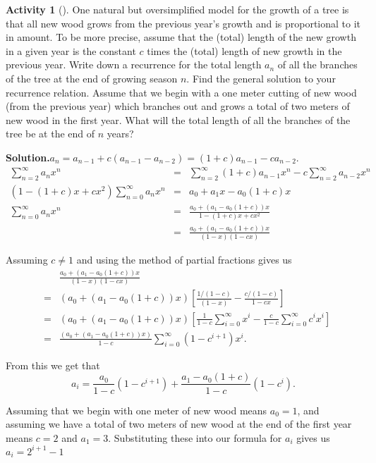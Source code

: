 \documentclass[10pt,]{book}
\theoremstyle{plain}
\theoremstyle{definition}
\newtheorem{activity}[project]{Activity}
\numberwithin{equation}{chapter}
\newcommand{\amp}{&}
\begin{document}
\begin{activity}[]\label{activity-203}
One natural but oversimplified model for the growth of a tree is that all new wood grows from the previous year's growth and is proportional to it in amount. To be more precise, assume that the (total) length of the new growth in a given year is the constant \(c\) times the (total) length of new growth in the previous year. Write down a recurrence for the total length \(a_n\) of all the branches of the tree at the end of growing season \(n\). Find the general solution to your recurrence relation. Assume that we begin with a one meter cutting of new wood (from the previous year) which branches out and grows a total of two meters of new wood in the first year.  What will the total length of all the branches of the tree be at the end of \(n\) years?%
\par\medskip\noindent%
\textbf{Solution.}\quad \(a_n= a_{n-1} +c(a_{n-1}-a_{n-2})=(1+c)a_{n-1}-ca_{n-2}\).%
\begin{align*}
\sum_{n=2}^\infty
a_nx^n\amp =\amp \sum_{n=2}^\infty(1+c)a_{n-1}x^n-c\sum_{n=2}^\infty a_{n-2}x^n\\
(1-(1+c)x +cx^2)\sum_{n=0}^\infty a_nx^n\amp =\amp a_0+a_1x-a_0(1+c)x\\
\sum_{n=0}^\infty a_nx^n \amp =\amp  \frac{a_0+(a_1-a_0(1+c))x}{1-(1+c)x +cx^2}\\
\amp =\amp  \frac{a_0+(a_1-a_0(1+c))x}{(1-x)(1-cx)}
\end{align*}
%
\par
Assuming \(c\not=1\) and using the method of partial fractions gives us%
\begin{align*}
\amp \amp \frac{a_0+(a_1-a_0(1+c))x}{(1-x)(1-cx)}\\
\amp =\amp  (a_0+(a_1-a_0(1+c))x)
\left[\frac{1/(1-c)}{(1-x)} -\frac{c/(1-c)}{1-cx}\right]\\
\amp =\amp  (a_0+(a_1-a_0(1+c))x)\left[\frac{1}{1-c}\sum_{i=0}^\infty x^i-\frac{c}{1-c}\sum_{i=0}^\infty c^ix^i\right]\\
\amp =\amp  \frac{(a_0+(a_1-a_0(1+c))x)}{1-c}\sum_{i=0}^\infty
(1-c^{i+1})x^i.
\end{align*}
%
\par
From this we get that%
\begin{equation*}
a_i=\frac{a_0}{1-c}(1-c^{i+1}) +\frac{a_1-a_0(1+c)}{1-c}(1-c^i).
\end{equation*}
%
\par
Assuming that we begin with one meter of new wood means \(a_0=1\), and assuming we have a total of two meters of new wood at the end of the first year means \(c=2\) and \(a_1=3\). Substituting these into our formula for \(a_i\) gives us \(a_i=2^{i+1}-1\)%
\end{activity}
\end{document}
